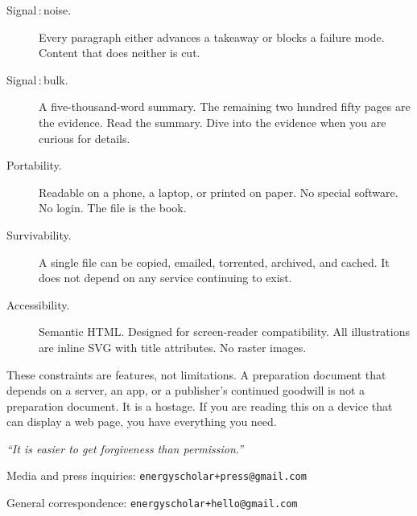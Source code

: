 \begin{description}
  \item[Signal\,:\,noise.] Every paragraph either advances a takeaway or
    blocks a failure mode. Content that does neither is cut.
  \item[Signal\,:\,bulk.] A five-thousand-word summary. The remaining two
    hundred fifty pages are the evidence. Read the summary. Dive into the
    evidence when you are curious for details.
  \item[Portability.] Readable on a phone, a laptop, or printed on paper.
    No special software. No login. The file is the book.
  \item[Survivability.] A single file can be copied, emailed, torrented,
    archived, and cached. It does not depend on any service continuing to
    exist.
  \item[Accessibility.] Semantic HTML. Designed for screen-reader
    compatibility. All illustrations are inline SVG with title attributes.
    No raster images.
\end{description}

These constraints are features, not limitations. A preparation document that
depends on a server, an app, or a publisher's continued goodwill is not a
preparation document. It is a hostage. If you are reading this on a device
that can display a web page, you have everything you need.

\vspace{1cm}

\textit{``It is easier to get forgiveness than permission.''}

\vspace{1cm}

\noindent Media and press inquiries: \texttt{energyscholar+press@gmail.com}

\noindent General correspondence: \texttt{energyscholar+hello@gmail.com}

